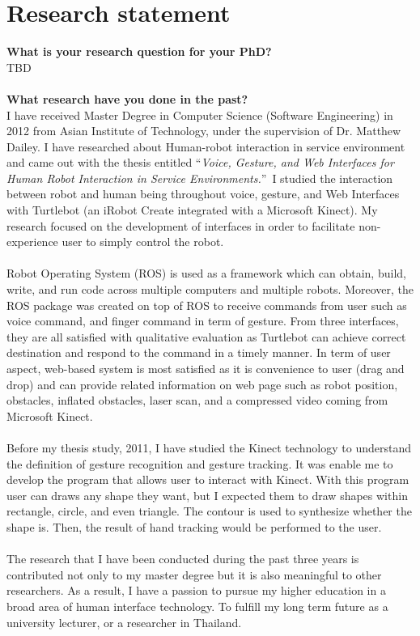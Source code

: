 \documentclass[11pt,a4paper,roman]{moderncv}        %
\begin{document}
\makecvtitle
\section{Research statement}
\textbf{What is your research question for your PhD?}
\\
TBD
\\
\\
\textbf{What research have you done in the past?}
\\
I have received Master Degree in Computer Science (Software Engineering) in 2012 from Asian Institute of Technology, under the supervision of Dr. Matthew Dailey. I have researched about Human-robot interaction in service environment and came out with the thesis entitled ``\emph{Voice, Gesture, and Web Interfaces for Human Robot Interaction in Service Environments.}''\ I studied the interaction between robot and human being throughout voice, gesture, and Web Interfaces with Turtlebot (an iRobot Create integrated with a Microsoft Kinect). My research focused on the development of interfaces in order to facilitate non-experience user to simply control the robot. 
\\
\\
Robot Operating System (ROS) is used as a framework which can obtain, build, write, and run code across multiple computers and multiple robots. Moreover, the ROS package was created on top of ROS to receive commands from user such as voice command, and finger command in term of gesture. From three interfaces, they are all satisfied with qualitative evaluation as Turtlebot can achieve correct destination and respond to the command in a timely manner. In term of user aspect, web-based system is most satisfied as it is convenience to user (drag and drop) and can provide related information on web page such as robot position, obstacles, inflated obstacles, laser scan, and a compressed video coming from Microsoft Kinect.
\\
\\
Before my thesis study, 2011, I have studied the Kinect technology to understand the definition of gesture recognition and gesture tracking. It was enable me to develop the program that allows user to interact with Kinect. With this program user can draws any shape they want, but I expected them to draw shapes within rectangle, circle, and even triangle. The contour is used to synthesize whether the shape is. Then, the result of hand tracking would be performed to the user. 
\\
\\
The research that I have been conducted during the past three years is contributed not only to my master degree but it is also meaningful to other researchers. As a result, I have a passion to pursue my higher education in a broad area of human interface technology. To fulfill my long term future as a university lecturer, or a researcher in Thailand. 
		
\end{document}
